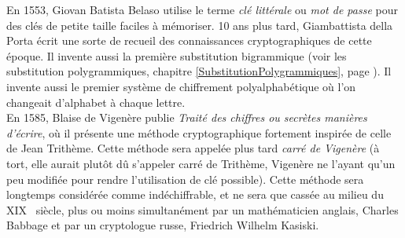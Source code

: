 



En 1553, Giovan Batista Belaso utilise le terme \emph{clé
  littérale} ou \emph{mot de passe} pour des clés de petite taille
faciles à mémoriser. %
10 ans plus tard, Giambattista della Porta écrit une sorte
de recueil des connaissances cryptographiques de cette époque. Il
invente aussi la première substitution bigrammique (voir les
substitution polygrammiques, chapitre
\ref{SubstitutionPolygrammiques}, page
\pageref{SubstitutionPolygrammiques}). Il invente aussi le premier
système de chiffrement polyalphabétique où l'on changeait d'alphabet à
chaque lettre. \\

En 1585, Blaise de Vigenère publie \emph{Traité des chiffres
  ou secrètes manières d'écrire}, où il présente une méthode
cryptographique fortement inspirée de celle de Jean Trithème. Cette
méthode sera appelée plus tard \emph{carré de Vigenère} (à tort,
elle aurait plutôt dû s'appeler carré de Trithème, Vigenère ne
l'ayant qu'un peu modifiée pour rendre l'utilisation de clé possible).
Cette méthode sera longtemps considérée comme indéchiffrable, et ne
sera que cassée au milieu du XIX\ieme~ siècle, plus ou moins
simultanément par un mathématicien anglais, Charles Babbage et
par un cryptologue russe, Friedrich Wilhelm Kasiski. \\

